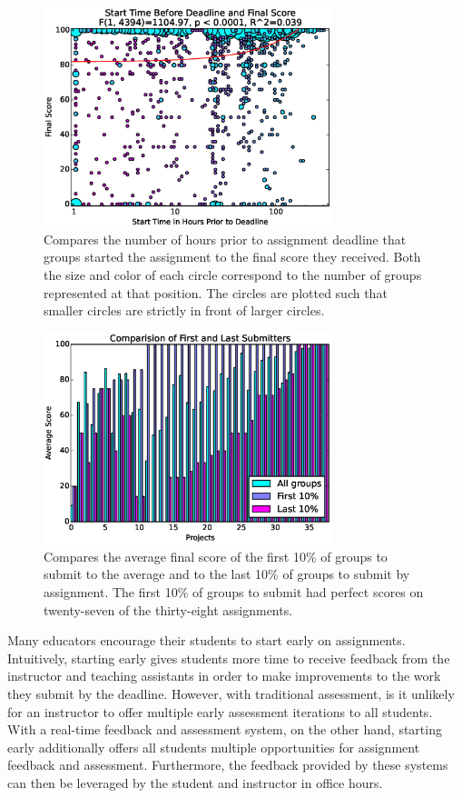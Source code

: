 \begin{figure}[!t]
\centering
\includegraphics[width=3.3in]{graphs/Start_Time_Before_Deadline_and_Final_Score.eps}
\caption{Compares the number of hours prior to assignment deadline that groups
  started the assignment to the final score they received. Both the size and
  color of each circle correspond to the number of groups represented at that
  position. The circles are plotted such that smaller circles are strictly in
  front of larger circles.}
\end{figure}

\begin{figure}[!t]
\centering
\includegraphics[width=3.3in]{graphs/Comparision_of_First_and_Last_Submitters.eps}
\caption{Compares the average final score of the first 10\% of groups to submit
  to the average and to the last 10\% of groups to submit by assignment. The
  first 10\% of groups to submit had perfect scores on twenty-seven of the
  thirty-eight assignments.}
\end{figure}

Many educators encourage their students to start early on
assignments. Intuitively, starting early gives students more time to receive
feedback from the instructor and teaching assistants in order to make
improvements to the work they submit by the deadline. However, with traditional
assessment, is it unlikely for an instructor to offer multiple early assessment
iterations to all students. With a real-time feedback and assessment system, on
the other hand, starting early additionally offers all students multiple
opportunities for assignment feedback and assessment. Furthermore, the feedback
provided by these systems can then be leveraged by the student and instructor
in office hours.

